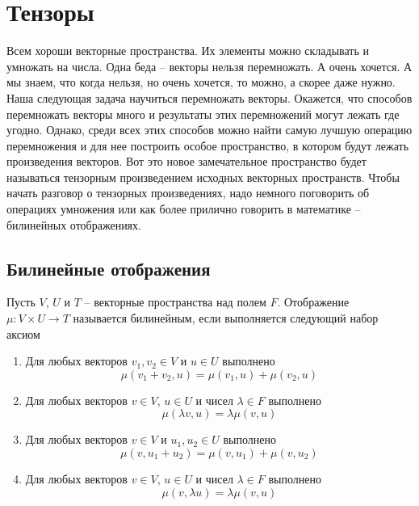 \newpage
\section{Тензоры}

Всем хороши векторные пространства.
Их элементы можно складывать и умножать на числа.
Одна беда -- векторы нельзя перемножать.
А очень хочется.
А мы знаем, что когда нельзя, но очень хочется, то можно, а скорее даже нужно.
Наша следующая задача научиться перемножать векторы.
Окажется, что способов перемножать векторы много и результаты этих перемножений могут лежать где угодно.
Однако, среди всех этих способов можно найти самую лучшую операцию перемножения и для нее построить особое пространство, в котором будут лежать произведения векторов.
Вот это новое замечательное пространство будет называться тензорным произведением исходных векторных пространств.
Чтобы начать разговор о тензорных произведениях, надо немного поговорить об операциях умножения или как более прилично говорить в математике -- билинейных отображениях.

\subsection{Билинейные отображения}

\begin{definition}
Пусть $V$, $U$ и $T$ -- векторные пространства над полем $F$.
Отображение $\mu\colon V\times U \to T$ называется билинейным, если выполняется следующий набор аксиом
\begin{enumerate}
\item Для любых векторов $v_1,v_2\in V$ и $u\in U$ выполнено
\[
\mu(v_1 + v_2, u) = \mu(v_1, u) + \mu(v_2, u)
\]

\item Для любых векторов $v\in V$, $u\in U$ и чисел $\lambda \in F$ выполнено
\[
\mu(\lambda v, u) = \lambda \mu(v, u)
\]

\item Для любых векторов $v\in V$ и $u_1,u_2\in U$ выполнено
\[
\mu(v, u_1 + u_2) = \mu(v, u_1) + \mu(v, u_2)
\]

\item Для любых векторов $v\in V$, $u\in U$ и чисел $\lambda \in F$ выполнено
\[
\mu(v, \lambda u) = \lambda \mu(v, u)
\]
\end{enumerate}
\end{definition}

